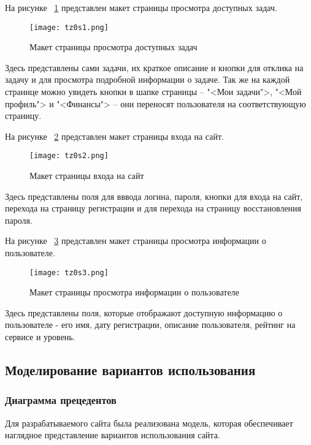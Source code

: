 На рисунке ~\ref{tz1:image} представлен макет страницы просмотра доступных задач.

\begin{figure}[ht]
\texttt{[image: tz0s1.png]}
\caption{Макет страницы просмотра доступных задач}
\label{tz1:image}
\end{figure}

Здесь представлены сами задачи, их краткое описание и кнопки для отклика на задачу и для просмотра подробной информации о задаче. Так же на каждой странице можно увидеть кнопки в шапке страницы -- "<Мои задачи">, "<Мой профиль"> и "<Финансы"> -- они переносят пользователя на соответствующую страницу.

На рисунке ~\ref{tz2:image} представлен макет страницы входа на сайт.
\clearpage

\begin{figure}[ht]
	\texttt{[image: tz0s2.png]}
	\caption{Макет страницы входа на сайт}
	\label{tz2:image}
\end{figure}

Здесь представлены поля для вввода логина, пароля, кнопки для входа на сайт, перехода на страницу регистрации и для перехода на страницу восстановления пароля.

На рисунке ~\ref{tz3:image} представлен макет страницы просмотра информации о пользователе.
\clearpage

\begin{figure}[ht]
	\texttt{[image: tz0s3.png]}
	\caption{Макет страницы просмотра информации о пользователе}
	\label{tz3:image}
\end{figure}

Здесь представлены поля, которые отображают доступную информацию о пользователе - его имя, дату регистрации, описание пользователя, рейтинг на сервисе и уровень.

\subsection{Моделирование вариантов использования}

\subsubsection{Диаграмма прецедентов}

Для разрабатываемого сайта была реализована модель, которая обеспечивает наглядное представление вариантов использования сайта.

